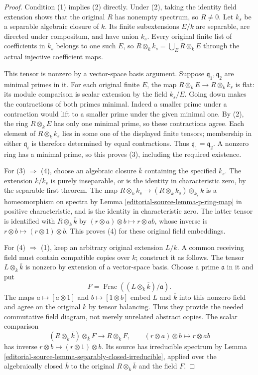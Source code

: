 \begin{proof}
Condition (1) implies (2) directly.
Under (2), taking the identity field
extension shows that the original
$R$ has nonempty spectrum, so $R\neq0$.
Let $k_s$ be a separable algebraic
closure of $k$. Its finite
subextensions $E/k$ are separable,
are directed under compositum,
and have union $k_s$.
Every original finite list of
coefficients in $k_s$ belongs to
one such $E$, so
$R\otimes_k k_s=\bigcup_E R\otimes_k E$
through the actual injective
coefficient maps.

This tensor is nonzero by a
vector-space basis argument.
Suppose $\mathfrak q_1,\mathfrak q_2$
are minimal primes in it.
For each original finite $E$,
the map $R\otimes_k E\to R\otimes_k k_s$
is flat: its module comparison
is scalar extension by the field
$k_s/E$. Going down makes the
contractions of both primes
minimal. Indeed a smaller prime
under a contraction would lift
to a smaller prime under the
given minimal one. By (2), the
ring $R\otimes_k E$ has only
one minimal prime, so these
contractions agree. Each element
of $R\otimes_k k_s$ lies in some
one of the displayed finite
tensors; membership in either
$\mathfrak q_i$ is therefore
determined by equal contractions.
Thus $\mathfrak q_1=\mathfrak q_2$.
A nonzero ring has a minimal
prime, so this proves (3),
including the required existence.

For (3) $\Rightarrow$ (4), choose
an algebraic closure $\overline k$
containing the specified $k_s$.
The extension $\overline k/k_s$
is purely inseparable, or is the
identity in characteristic zero,
by the separable-first theorem.
The map
$R\otimes_k k_s\to(R\otimes_k k_s)\otimes_{k_s}\overline k$
is a homeomorphism on spectra
by Lemma \ref{editorial-source-lemma-p-ring-map}
in positive characteristic, and
is the identity in characteristic
zero. The latter tensor is
identified with $R\otimes_k\overline k$
by
$(r\otimes a)\otimes b\mapsto r\otimes ab$,
whose inverse is
$r\otimes b\mapsto(r\otimes1)\otimes b$.
This proves (4) for these original
field embeddings.

For (4) $\Rightarrow$ (1), keep
an arbitrary original extension
$L/k$. A common receiving field
must contain compatible copies
over $k$; construct it as follows.
The tensor $L\otimes_k\overline k$
is nonzero by extension of a
vector-space basis. Choose a
prime $\mathfrak a$ in it and put
$$
F=\operatorname{Frac}((L\otimes_k\overline k)/\mathfrak a).
$$
The maps $a\mapsto[a\otimes1]$
and $b\mapsto[1\otimes b]$ embed
$L$ and $\overline k$ into this
nonzero field and agree on the
original $k$ by tensor balancing.
Thus they provide the needed
commutative field diagram, not
merely unrelated abstract copies.
The scalar comparison
$$
(R\otimes_k\overline k)\otimes_{\overline k}F
\longrightarrow R\otimes_k F,
\qquad(r\otimes a)\otimes b\longmapsto r\otimes ab
$$
has inverse $r\otimes b\mapsto(r\otimes1)\otimes b$.
Its source has irreducible
spectrum by Lemma
\ref{editorial-source-lemma-separably-closed-irreducible},
applied over the algebraically
closed $\overline k$ to the
original $R\otimes_k\overline k$
and the field $F$.


\end{proof}

